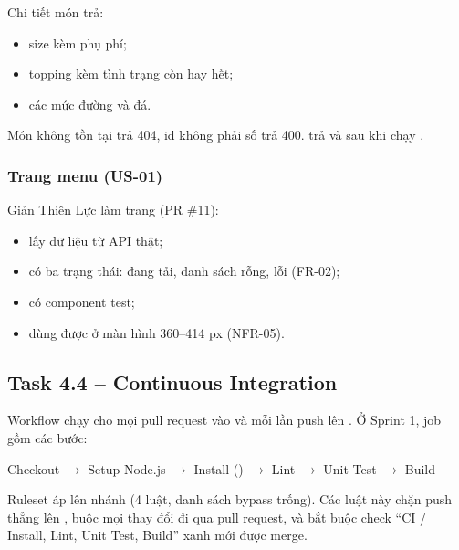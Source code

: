 Chi tiết món trả:
\begin{itemize}
\item size kèm phụ phí;
\item topping kèm tình trạng còn hay hết;
\item các mức đường và đá.
\end{itemize}

Món không tồn tại trả 404, id không phải số trả 400.  trả  và  sau khi chạy .


\subsubsection{Trang menu (US-01)}
Giản Thiên Lực làm trang  (PR \#11):
\begin{itemize}
\item lấy dữ liệu từ API thật;
\item có ba trạng thái: đang tải, danh sách rỗng, lỗi (FR-02);
\item có component test;
\item dùng được ở màn hình 360--414 px (NFR-05).
\end{itemize}


\subsection{Task 4.4 -- Continuous Integration}
Workflow  chạy cho mọi pull request vào  và mỗi lần push lên . Ở Sprint 1, job gồm các bước:
\begin{center}
Checkout $\rightarrow$ Setup Node.js $\rightarrow$ Install () $\rightarrow$ Lint $\rightarrow$ Unit Test $\rightarrow$ Build
\end{center}

Ruleset  áp lên nhánh  (4 luật, danh sách bypass trống). Các luật này chặn push thẳng lên , buộc mọi thay đổi đi qua pull request, và bắt buộc check ``CI / Install, Lint, Unit Test, Build'' xanh mới được merge.

